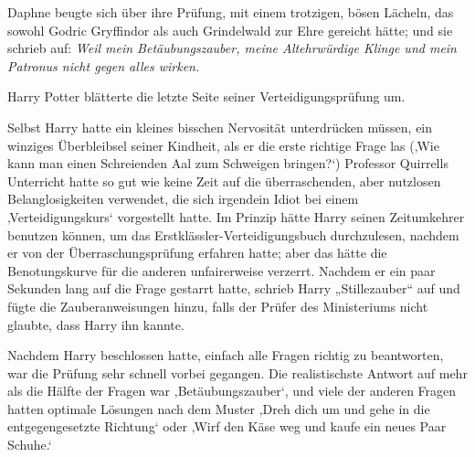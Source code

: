 Daphne beugte sich über ihre Prüfung, mit einem trotzigen, bösen Lächeln, das sowohl Godric Gryffindor als auch Grindelwald zur Ehre gereicht hätte; und sie schrieb auf:
\emph{Weil mein Betäubungszauber, meine Altehrwürdige Klinge und mein Patronus nicht gegen alles wirken.}

\later

Harry Potter blätterte die letzte Seite seiner Verteidigungsprüfung um.

Selbst Harry hatte ein kleines bisschen Nervosität unterdrücken müssen, ein winziges Überbleibsel seiner Kindheit, als er die erste richtige Frage las
(‚Wie kann man einen Schreienden Aal zum Schweigen bringen?‘)
Professor Quirrells Unterricht hatte so gut wie keine Zeit auf die überraschenden, aber nutzlosen Belanglosigkeiten verwendet, die sich irgendein Idiot bei einem ‚Verteidigungskurs‘ vorgestellt hatte. Im Prinzip hätte Harry seinen Zeitumkehrer benutzen können, um das Erstklässler-Verteidigungsbuch durchzulesen, nachdem er von der Überraschungsprüfung erfahren hatte; aber das hätte die Benotungskurve für die anderen unfairerweise verzerrt.
Nachdem er ein paar Sekunden lang auf die Frage gestarrt hatte, schrieb Harry „Stillezauber“ auf und fügte die Zauberanweisungen hinzu, falls der Prüfer des Ministeriums nicht glaubte, dass Harry ihn kannte.

Nachdem Harry beschlossen hatte, einfach alle Fragen richtig zu beantworten, war die Prüfung sehr schnell vorbei gegangen. Die realistischste Antwort auf mehr als die Hälfte der Fragen war ‚Betäubungszauber‘, und viele der anderen Fragen hatten optimale Lösungen nach dem Muster ‚Dreh dich um und gehe in die entgegengesetzte Richtung‘ oder ‚Wirf den Käse weg und kaufe ein neues Paar Schuhe.‘

